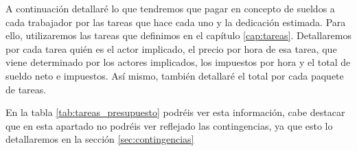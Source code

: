 \begin{table}[H]
    \centering
    \caption{Salarios netos medios por hora para cada rol (Glassdor)}
    \label{tab:presupuesto_roles}
\end{table}

A continuación detallaré lo que tendremos que pagar en concepto de sueldos a cada trabajador por las tareas que hace cada uno y la dedicación estimada. Para ello, utilizaremos
las tareas que definimos en el capítulo \ref{cap:tareas}. Detallaremos por cada tarea quién es el actor implicado, el precio por hora de esa tarea, que viene determinado
por los actores implicados, los impuestos por hora y el total de sueldo neto e impuestos. Así mismo, también detallaré el total por cada paquete de tareas.

En la tabla \ref{tab:tareas_presupuesto} podréis ver esta información, cabe destacar que en esta apartado no podréis ver reflejado las contingencias, ya que esto
lo detallaremos en la sección \ref{sec:contingencias}

